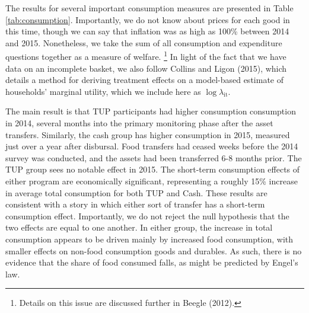\documentclass[12pt,article]{article}
\begin{document}
The results for several important consumption measures are presented in Table
\ref{tab:consumption}. Importantly, we do not know about prices for each good in this
time, though we can say that inflation was as high as 100\% between 2014 and 2015.
Nonetheless, we take the sum of all consumption and expenditure questions together as
a measure of welfare. \footnote{Details on this issue are discussed further in Beegle
(2012).} In light of the fact that we have data on an incomplete basket, we also
follow Collins and Ligon (2015), which details a method for deriving treatment
effects on a model-based estimate of households' marginal utility, which we include
here as $\log$$\lambda$$_{\text{it}}$.

The main result is that TUP participants had higher consumption consumption in 2014,
several months into the primary monitoring phase after the asset transfers.
Similarly, the cash group has higher consumption in 2015, measured just over a year
after disbursal. Food transfers had ceased weeks before the 2014 survey was
conducted, and the assets had been transferred 6-8 months prior. The TUP group sees
no notable effect in 2015. The short-term consumption effects of either program are
economically significant, representing a roughly 15\% increase in average total
consumption for both TUP and Cash. These results are consistent with a story in which
either sort of transfer has a short-term consumption effect. Importantly, we do not
reject the null hypothesis that the two effects are equal to one another. In either
group, the increase in total consumption appears to be driven mainly by increased
food consumption, with smaller effects on non-food consumption goods and durables. As
such, there is no evidence that the share of food consumed falls, as might be
predicted by Engel's law.

\newpage
\end{document}
